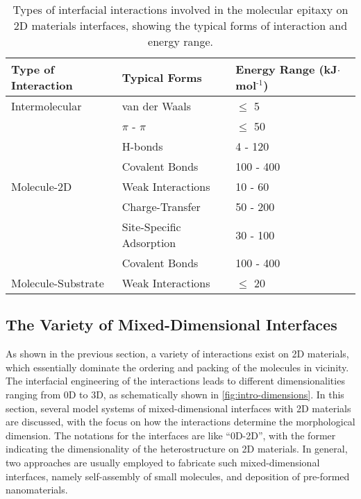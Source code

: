 \begin{table}[!htbp]
\caption{\label{tbl:intro-interactions}
Types of interfacial interactions involved in the molecular epitaxy on 2D materials interfaces, showing the typical forms of interaction and energy range.}
\small
\centering
  \begin{tabular}[\textwidth]{lll}
\hline
Type of Interaction & Typical Forms & Energy Range  (kJ\(\cdot\)mol\(^{\text{-1}}\))\\
\hline
Intermolecular & van der Waals & \(\le\) 5\\
 & \(\pi\) - \(\pi\) & \(\le\) 50\\
 & H-bonds & 4 - 120 ~\autocite{jeffrey_introduction_1997}\\
 & Covalent Bonds & 100 - 400\\
\hline
Molecule-2D & Weak Interactions & 10 - 60 ~\autocite{Lazar_2013}\\
 & Charge-Transfer & 50 - 200\\
 & Site-Specific Adsorption & 30 - 100\\
 & Covalent Bonds & 100 - 400\\
\hline
Molecule-Substrate & Weak Interactions & \(\le\) 20\\
\hline
\end{tabular}
\end{table}

\subsection{The Variety of Mixed-Dimensional Interfaces}
\label{sec:vari-mixed-dimens}

As shown in the previous section, a variety of interactions exist on 2D
materials, which
essentially dominate the ordering and packing of the molecules in vicinity.
%
The interfacial engineering of the interactions leads to different
dimensionalities ranging from 0D to 3D, as schematically shown in
\autoref{fig:intro-dimensions}.
%
In this section, several model systems of mixed-dimensional interfaces
with 2D materials are discussed, with the focus on how the
interactions determine the morphological dimension. The notations for
the interfaces are like ``0D-2D'', with the former indicating the
dimensionality of the heterostructure on 2D materials. In general, two
approaches are usually employed to fabricate such mixed-dimensional
interfaces, namely self-assembly of small molecules, and deposition of
pre-formed nano\-materials. 

